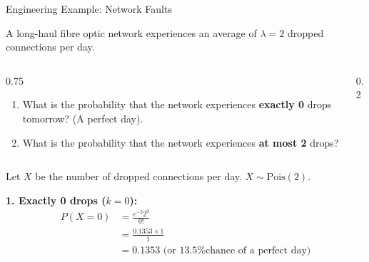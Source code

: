 \begin{frame}[allowframebreaks]{Engineering Example: Network Faults}
    \begin{example}
        A long-haul fibre optic network experiences an average of $\lambda = 2$ dropped connections per day. 
        
        \vspace{0.2cm}
        \begin{columns}[T, onlytextwidth]
            \begin{column}{0.75\textwidth}
                \begin{enumerate}
                    \item What is the probability that the network experiences \textbf{exactly 0} drops tomorrow? (A perfect day).
                    \item What is the probability that the network experiences \textbf{at most 2} drops?
                \end{enumerate}
            \end{column}
            
            \begin{column}{0.2\textwidth}
            \end{column}
        \end{columns}
    \end{example}

    \framebreak

    \begin{solution}
        Let $X$ be the number of dropped connections per day. $X \sim \text{Pois}(2)$.
        
        \vspace{0.2cm}
        \textbf{1. Exactly 0 drops ($k=0$):}
        \begin{align*}
            P(X=0) &= \frac{e^{-2} 2^0}{0!} \\
                   &= \frac{0.1353 \times 1}{1} \\
                   &= \mathbf{0.1353} \text{ (or 13.5\% chance of a perfect day)}
        \end{align*}
    \end{solution}
    

\end{frame}
